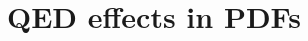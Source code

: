 \documentclass[aspectratio=169, 9pt,t]{beamer}
\begin{document}







\section{QED effects in PDFs}
\end{document}
